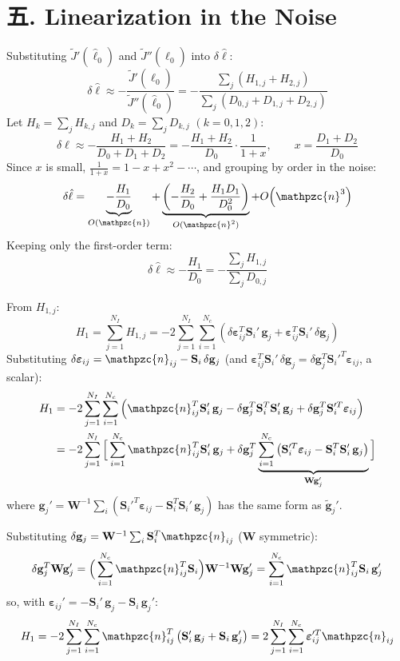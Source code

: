 \documentclass[11pt]{article}
\newcommand{\lh}{\hat{\ell}}
\newcommand{\dl}{\delta\hat{\ell}}
\newcommand{\nn}{\mathpzc{n}}   %
\begin{document}
\section*{{\cjk 五.} Linearization in the Noise}

Substituting $\tilde{J}'(\lh_0)$ and $\tilde{J}''(\lh_0)$ into $\dl$:
\[
\dl\approx-\frac{\tilde{J}'(\lh_0)}{\tilde{J}''(\lh_0)}
=-\frac{\sum_{j}\left(H_{1,j}+H_{2,j}\right)}{\sum_{j}\left(D_{0,j}+D_{1,j}+D_{2,j}\right)}
\]
Let $H_k=\sum_{j}H_{k,j}$ and $D_k=\sum_{j}D_{k,j}$ $(k=0,1,2)$:
\[
\dl\approx-\frac{H_1+H_2}{D_0+D_1+D_2}=-\frac{H_1+H_2}{D_0}\cdot\frac{1}{1+x},\qquad x=\frac{D_1+D_2}{D_0}
\]
Since $x$ is small, $\frac{1}{1+x}=1-x+x^{2}-\cdots$, and grouping by order in the noise:
\[
\dl=\underbrace{-\frac{H_1}{D_0}}_{O(\nn)}
+\underbrace{\left(-\frac{H_2}{D_0}+\frac{H_1D_1}{D_0^{2}}\right)}_{O(\nn^{2})}+O\!\left(\nn^{3}\right)
\]
Keeping only the first-order term:
\[
\dl\approx-\frac{H_1}{D_0}=-\frac{\sum_{j}H_{1,j}}{\sum_{j}D_{0,j}}
\]

From $H_{1,j}$:
\[
H_1=\sum_{j=1}^{N_I}H_{1,j}=-2\sum_{j=1}^{N_I}\sum_{i=1}^{N_c}\left(\delta\boldsymbol{\varepsilon}_{ij}^{T}\mathbf{S}_i'\,\mathbf{g}_j+\boldsymbol{\varepsilon}_{ij}^{T}\mathbf{S}_i'\,\delta\mathbf{g}_j\right)
\]
Substituting $\delta\boldsymbol{\varepsilon}_{ij}=\nn_{ij}-\mathbf{S}_i\,\delta\mathbf{g}_j$
(and $\boldsymbol{\varepsilon}_{ij}^{T}\mathbf{S}_i'\,\delta\mathbf{g}_j=\delta\mathbf{g}_j^{T}\mathbf{S}_i'^{T}\boldsymbol{\varepsilon}_{ij}$, a scalar):
\[
\begin{aligned}
H_1&=-2\sum_{j=1}^{N_I}\sum_{i=1}^{N_c}\left(\nn_{ij}^{T}\mathbf{S}_i'\,\mathbf{g}_j-\delta\mathbf{g}_j^{T}\mathbf{S}_i^{T}\mathbf{S}_i'\,\mathbf{g}_j+\delta\mathbf{g}_j^{T}\mathbf{S}_i'^{T}\boldsymbol{\varepsilon}_{ij}\right)\\
&=-2\sum_{j=1}^{N_I}\Big[\sum_{i=1}^{N_c}\nn_{ij}^{T}\mathbf{S}_i'\,\mathbf{g}_j
+\delta\mathbf{g}_j^{T}\underbrace{\sum_{i=1}^{N_c}\left(\mathbf{S}_i'^{T}\boldsymbol{\varepsilon}_{ij}-\mathbf{S}_i^{T}\mathbf{S}_i'\,\mathbf{g}_j\right)}_{\mathbf{W}\mathbf{g}_j'}\Big]
\end{aligned}
\]
where $\mathbf{g}_j'=\mathbf{W}^{-1}\sum_{i}\left(\mathbf{S}_i'^{T}\boldsymbol{\varepsilon}_{ij}-\mathbf{S}_i^{T}\mathbf{S}_i'\,\mathbf{g}_j\right)$ has the same form as $\tilde{\mathbf{g}}_j'$.

Substituting $\delta\mathbf{g}_j=\mathbf{W}^{-1}\sum_{i}\mathbf{S}_i^{T}\nn_{ij}$ ($\mathbf{W}$ symmetric):
\[
\delta\mathbf{g}_j^{T}\mathbf{W}\mathbf{g}_j'=\Big(\sum_{i=1}^{N_c}\nn_{ij}^{T}\mathbf{S}_i\Big)\mathbf{W}^{-1}\mathbf{W}\mathbf{g}_j'=\sum_{i=1}^{N_c}\nn_{ij}^{T}\mathbf{S}_i\,\mathbf{g}_j'
\]
so, with $\boldsymbol{\varepsilon}_{ij}'=-\mathbf{S}_i'\,\mathbf{g}_j-\mathbf{S}_i\,\mathbf{g}_j'$:
\[
H_1=-2\sum_{j=1}^{N_I}\sum_{i=1}^{N_c}\nn_{ij}^{T}\left(\mathbf{S}_i'\,\mathbf{g}_j+\mathbf{S}_i\,\mathbf{g}_j'\right)
=2\sum_{j=1}^{N_I}\sum_{i=1}^{N_c}\boldsymbol{\varepsilon}_{ij}'^{T}\nn_{ij}
\]
\end{document}
